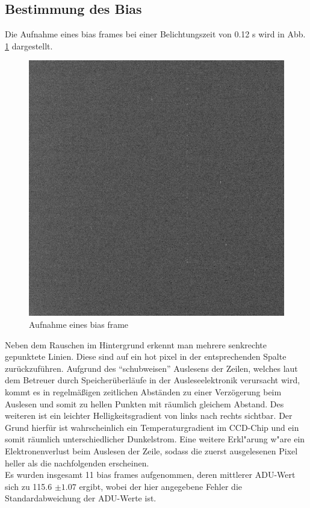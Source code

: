 \subsection{Bestimmung des Bias}
Die Aufnahme eines bias frames bei einer Belichtungszeit von 0.12 s wird in Abb. \ref{fig:bias} dargestellt. 
\begin{figure}[h!]
\centering
        \includegraphics[width=.9\textwidth]{beiers_01.png}
\caption{ Aufnahme eines bias frame }
\label{fig:bias}
\end{figure}
Neben dem Rauschen im Hintergrund erkennt man mehrere senkrechte gepunktete Linien. Diese sind auf ein hot pixel in der entsprechenden Spalte zurückzuführen. Aufgrund des \enquote{schubweisen} Auslesens der Zeilen, welches laut dem Betreuer durch Speicherüberläufe in der Ausleseelektronik verursacht wird, kommt es in regelmäßigen zeitlichen Abständen zu einer Verzögerung beim Auslesen und somit zu hellen Punkten mit räumlich gleichem Abstand. Des weiteren ist ein leichter Helligkeitsgradient von links nach rechts sichtbar. Der Grund hierfür ist wahrscheinlich ein Temperaturgradient im CCD-Chip und ein somit räumlich unterschiedlicher Dunkelstrom. Eine weitere Erkl"arung w"are ein Elektronenverlust beim Auslesen der Zeile, sodass die zuerst ausgelesenen Pixel heller als die nachfolgenden erscheinen.\\
Es wurden insgesamt 11 bias frames aufgenommen, deren mittlerer ADU-Wert sich zu 115.6 $ \pm 1.07$ ergibt, wobei der hier angegebene Fehler die Standardabweichung der ADU-Werte ist. \\\
